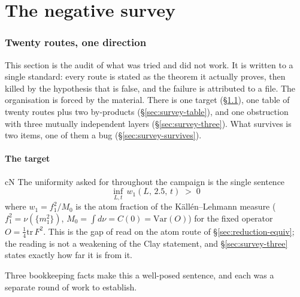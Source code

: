 \clearpage
\part{The negative survey}
\section{Twenty routes, one direction}\label{sec:survey}

This section is the audit of what was tried and did not work. It is written to a single
standard: every route is stated as the theorem it actually proves, then killed by the
hypothesis that is false, and the failure is attributed to a file. The organisation is
forced by the material. There is one target (\S\ref{sec:survey-target}), one table of
twenty routes plus two by-products (\S\ref{sec:survey-table}), and one obstruction with
three mutually independent layers (\S\ref{sec:survey-three}). What survives is two items,
one of them a bug (\S\ref{sec:survey-survives}).

\subsection{The target}\label{sec:survey-target}

\begin{claimbox}{cN}
 The uniformity asked for throughout the campaign is the
single sentence
\[
\boxed{\;\inf_{L,t}\, w_1\!\left(L,\,2.5,\,t\right) \;>\; 0\;}
\]
where $w_1=f_1^2/M_0$ is the atom fraction of the K\"all\'en--Lehmann measure
($f_1^2=\nu(\{m_1^2\})$, $M_0=\int d\nu=C(0)=\mathrm{Var}(O)$) for the fixed operator
$O=\tfrac14\mathrm{tr}\,F^2$. This is the gap of \cite{jaffe} read on the atom route of
\S\ref{sec:reduction-equiv}; the reading is not a weakening of the Clay statement, and
\S\ref{sec:survey-three} states exactly how far it is from it.
\end{claimbox}

Three bookkeeping facts make this a well-posed sentence, and each was a separate round of
work to establish.

